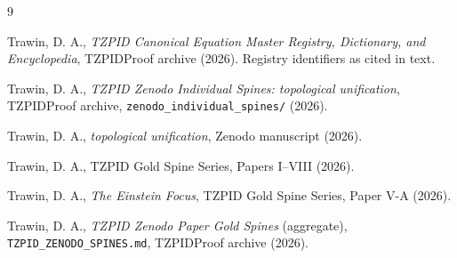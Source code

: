 \documentclass[11pt]{article}
\theoremstyle{remark}
\begin{document}
\begin{thebibliography}{9}

 Trawin, D. A., \emph{TZPID Canonical Equation Master Registry, Dictionary, and Encyclopedia}, TZPIDProof archive (2026). Registry identifiers as cited in text.

 Trawin, D. A., \emph{TZPID Zenodo Individual Spines: topological unification}, TZPIDProof archive, \texttt{zenodo\_individual\_spines/} (2026).

 Trawin, D. A., \emph{topological unification}, Zenodo manuscript (2026).

 Trawin, D. A., TZPID Gold Spine Series, Papers I--VIII (2026).

 Trawin, D. A., \emph{The Einstein Focus}, TZPID Gold Spine Series, Paper V-A (2026).

 Trawin, D. A., \emph{TZPID Zenodo Paper Gold Spines} (aggregate), \texttt{TZPID\_ZENODO\_SPINES.md}, TZPIDProof archive (2026).

\end{thebibliography}
\end{document}
